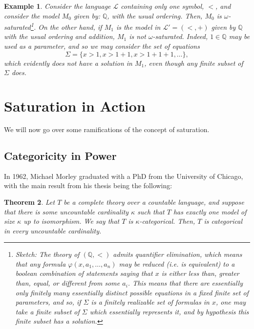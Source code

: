 \documentclass{article}
\newtheorem{theorem}{Theorem}[section]
\newtheorem{example}[theorem]{Example}
\theoremstyle{nonumberplain}
\newcommand{\Q}{\mathbb{Q}}
\newcommand{\Lang}{\mathcal{L}}
\begin{document}
\begin{example}
Consider the language $\Lang$ containing only one symbol, $<$, and consider the model $M_0$ given by: $\Q$, with the usual ordering. Then, $M_0$ is $\omega$-saturated\footnote{Sketch: The theory of $(\Q,<)$ admits quantifier elimination, which means that any formula $\varphi(x,a_1, \dots, a_n)$ may be reduced (i.e. is equivalent) to a boolean combination of statements saying that $x$ is either less than, greater than, equal, or different from some $a_i$. This means that there are essentially only finitely many essentially distinct possible equations in a fixed finite set of parameters, and so, if $\Sigma$ is a finitely realizable set of formulas in $x$, one may take a finite subset of $\Sigma$ which essentially represents it, and by hypothesis this finite subset has a solution.}. On the other hand, if $M_1$ is the model in $\Lang' = (<,+)$ given by $\Q$ with the usual ordering and addition, $M_1$ is not $\omega$-saturated. Indeed, $1 \in \Q$ may be used as a parameter, and so we may consider the set of equations
\begin{equation}
\Sigma = \{ x > 1, x > 1+1, x>1+1+1, \dots \},
\end{equation}
which evidently does not have a solution in $M_1$, even though any finite subset of $\Sigma$ does.
\end{example}

\section{Saturation in Action}

We will now go over some ramifications of the concept of saturation.

\subsection{Categoricity in Power}\label{sec:morley}

In 1962, Michael Morley graduated with a PhD from the University of Chicago, with the main result from his thesis \cite{morley} being the following:
\begin{theorem}\label{thm:morley}
Let $T$ be a complete theory over a countable language, and suppose that there is some uncountable cardinality $\kappa$ such that $T$ has \emph{exactly} one model of size $\kappa$ up to isomorphism. We say that $T$ is \emph{$\kappa$-categorical}. Then, $T$ is categorical in every uncountable cardinality.
\end{theorem}
\end{document}
